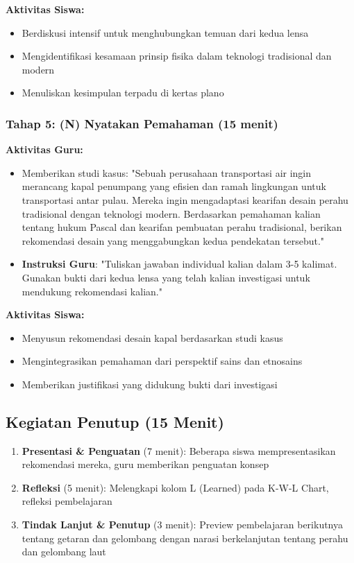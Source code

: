 \documentclass[12pt,a4paper]{article}
\begin{document}
\textbf{Aktivitas Siswa:}
\begin{itemize}
\item Berdiskusi intensif untuk menghubungkan temuan dari kedua lensa
\item Mengidentifikasi kesamaan prinsip fisika dalam teknologi tradisional dan modern
\item Menuliskan kesimpulan terpadu di kertas plano
\end{itemize}

\subsubsection{Tahap 5: (N) Nyatakan Pemahaman (15 menit)}

\textbf{Aktivitas Guru:}
\begin{itemize}
\item Memberikan studi kasus: "Sebuah perusahaan transportasi air ingin merancang kapal penumpang yang efisien dan ramah lingkungan untuk transportasi antar pulau. Mereka ingin mengadaptasi kearifan desain perahu tradisional dengan teknologi modern. Berdasarkan pemahaman kalian tentang hukum Pascal dan kearifan pembuatan perahu tradisional, berikan rekomendasi desain yang menggabungkan kedua pendekatan tersebut."
\item \textbf{Instruksi Guru}: "Tuliskan jawaban individual kalian dalam 3-5 kalimat. Gunakan bukti dari kedua lensa yang telah kalian investigasi untuk mendukung rekomendasi kalian."
\end{itemize}

\textbf{Aktivitas Siswa:}
\begin{itemize}
\item Menyusun rekomendasi desain kapal berdasarkan studi kasus
\item Mengintegrasikan pemahaman dari perspektif sains dan etnosains
\item Memberikan justifikasi yang didukung bukti dari investigasi
\end{itemize}

\subsection{Kegiatan Penutup (15 Menit)}

\begin{enumerate}
\item \textbf{Presentasi \& Penguatan} (7 menit): Beberapa siswa mempresentasikan rekomendasi mereka, guru memberikan penguatan konsep
\item \textbf{Refleksi} (5 menit): Melengkapi kolom L (Learned) pada K-W-L Chart, refleksi pembelajaran
\item \textbf{Tindak Lanjut \& Penutup} (3 menit): Preview pembelajaran berikutnya tentang getaran dan gelombang dengan narasi berkelanjutan tentang perahu dan gelombang laut
\end{enumerate}
\end{document}
